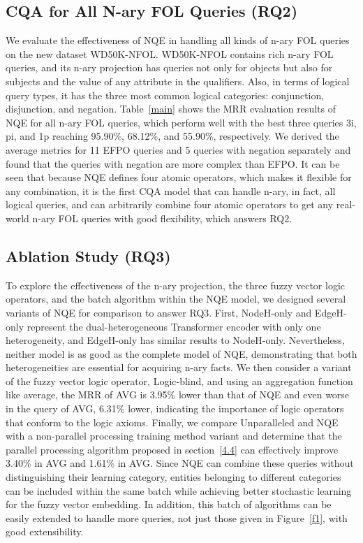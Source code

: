 \documentclass[letterpaper]{article} \usepackage{aaai23}  \usepackage{times}  \usepackage{helvet}  \usepackage{courier}  \usepackage[hyphens]{url}  \usepackage{graphicx} \urlstyle{rm} \def\UrlFont{\rm}  \usepackage{natbib}  \usepackage{caption} \frenchspacing  \setlength{\pdfpagewidth}{8.5in}  \setlength{\pdfpageheight}{11in}  \usepackage{algorithm}
\begin{document}
\subsection{CQA for All N-ary FOL Queries (RQ2)}
We evaluate the effectiveness of NQE in handling all kinds of n-ary FOL queries on the new dataset WD50K-NFOL. WD50K-NFOL contains rich n-ary FOL queries, and its n-ary projection has queries not only for objects but also for subjects and the value of any attribute in the qualifiers. Also, in terms of logical query types, it has the three most common logical categories: conjunction, disjunction, and negation. 
Table~\ref{main} shows the MRR evaluation results of NQE for all n-ary FOL queries, which perform well with the best three queries 3i, pi, and 1p reaching 95.90\%, 68.12\%, and 55.90\%, respectively. We derived the average metrics for 11 EFPO queries and 5 queries with negation separately and found that the queries with negation are more complex than EFPO. It can be seen that because NQE defines four atomic operators, which makes it flexible for any combination, it is the first CQA model that can handle n-ary, in fact, all logical queries, and can arbitrarily combine four atomic operators to get any real-world n-ary FOL queries with good flexibility, which answers RQ2.

\subsection{Ablation Study (RQ3)} 
To explore the effectiveness of the n-ary projection, the three fuzzy vector logic operators, and the batch algorithm within the NQE model, we designed several variants of NQE for comparison to answer RQ3. First, NodeH-only and EdgeH-only represent the dual-heterogeneous Transformer encoder with only one heterogeneity, and EdgeH-only has similar results to NodeH-only. Nevertheless, neither model is as good as the complete model of NQE, demonstrating that both heterogeneities are essential for acquiring n-ary facts. We then consider a variant of the fuzzy vector logic operator, Logic-blind, and using an aggregation function like average, the MRR of AVG is 3.95\% lower than that of NQE and even worse in the query of AVG, 6.31\% lower, indicating the importance of logic operators that conform to the logic axioms. Finally, we compare Unparalleled and NQE with a non-parallel processing training method variant and determine that the parallel processing algorithm proposed in section~\ref{4.4} can effectively improve 3.40\% in AVG and 1.61\% in AVG. Since NQE can combine these queries without distinguishing their learning category, entities belonging to different categories can be included within the same batch while achieving better stochastic learning for the fuzzy vector embedding. In addition, this batch of algorithms can be easily extended to handle more queries, not just those given in Figure~\ref{f1}, with good extensibility.
\end{document}
